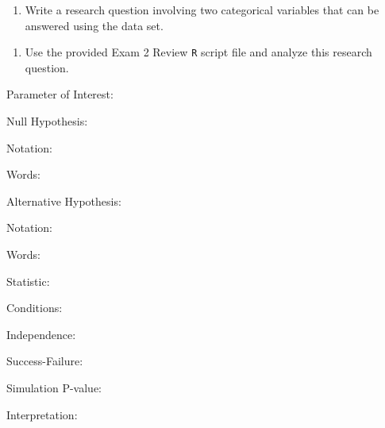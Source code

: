 \documentclass[
]{report}
\providecommand{\tightlist}{%
  \setlength{\itemsep}{0pt}\setlength{\parskip}{0pt}}
\newcommand{\rgi}{\hspace{24pt}}  %
\begin{document}
\vspace{0.8in}

\begin{enumerate}
\def\labelenumi{\arabic{enumi}.}
\setcounter{enumi}{2}
\tightlist
\item
  Write a research question involving two categorical variables that can be answered using the data set.
\end{enumerate}

\vspace{0.8in}

\begin{enumerate}
\def\labelenumi{\arabic{enumi}.}
\setcounter{enumi}{3}
\tightlist
\item
  Use the provided Exam 2 Review \texttt{R} script file and analyze this research question.
\end{enumerate}

\rgi Parameter of Interest:

\vspace{0.3in}

\rgi Null Hypothesis:

\rgi \rgi Notation:

\vspace{0.3in}

\rgi \rgi Words:

\vspace{0.5in}

\rgi Alternative Hypothesis:

\rgi \rgi Notation:

\vspace{0.3in}

\rgi \rgi Words:

\vspace{0.5in}

\rgi Statistic:

\vspace{0.3in}

\rgi Conditions:

\rgi \rgi Independence:

\vspace{0.8in}

\rgi \rgi Success-Failure:

\vspace{0.8in}

\rgi Simulation P-value:

\vspace{0.3in}

\rgi \rgi Interpretation:
\end{document}
